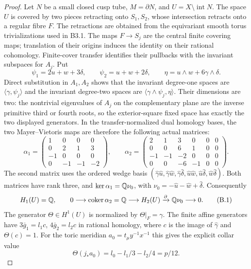 \begin{proof}
Let $N$ be a small closed cusp tube, $M=\partial N$, and
$U=X\setminus\operatorname{int}N$. The space $U$ is covered by
two pieces retracting onto $S_1,S_2$, whose intersection retracts
onto a regular fibre $F$. The retractions are obtained from the
equivariant smooth torus trivializations used in B3.1. The maps
$F\to S_j$ are the central finite covering maps; translation of
their origins induces the identity on their rational cohomology.
Finite-cover transfer identifies their pullbacks with the invariant
subspaces for $A_j$. Put
\[
 \psi_1=2u+w+3\delta,\qquad \psi_2=u+w+2\delta,
 \qquad \eta=u\wedge w+6\gamma\wedge\delta.
\]
Direct substitution in $A_1,A_2$ shows that the invariant
degree-one spaces are $\langle\gamma,\psi_j\rangle$ and the
invariant degree-two spaces are
$\langle\gamma\wedge\psi_j,\eta\rangle$.
Their dimensions are two: the nontrivial eigenvalues of $A_j$ on
the complementary plane are the inverse primitive third or fourth
roots, so the exterior-square fixed space has exactly the two
displayed generators.
In the transfer-normalized dual homology bases, the two
Mayer--Vietoris maps are therefore the following actual matrices:
\[
 \alpha_1=\begin{pmatrix}
 1&0&0&0\\0&2&1&3\\-1&0&0&0\\0&-1&-1&-2
 \end{pmatrix},\qquad
 \alpha_2=\begin{pmatrix}
 2&1&3&0&0&0\\0&0&6&1&0&0\\
 -1&-1&-2&0&0&0\\0&0&-6&-1&0&0
 \end{pmatrix}.
\]
The second matrix uses the ordered wedge basis
$(\hat\gamma\hat u,\hat\gamma\hat w,\hat\gamma\hat\delta,
\hat u\hat w,\hat u\hat\delta,\hat w\hat\delta)$.
Both matrices have rank three, and
$\ker\alpha_1=\mathbb Q\nu_0$, with
$\nu_0=-\hat u-\hat w+\hat\delta$.
Consequently
\[
 H_1(U)=\mathbb Q,\qquad
 0\longrightarrow\operatorname{coker}\alpha_2=\mathbb Q
 \longrightarrow H_2(U)
 \xrightarrow{\partial}\mathbb Q\nu_0\longrightarrow0.       \tag{B.1}
\]
The generator $\Theta\in H^1(U)$ is normalized by
$\Theta|_F=\gamma$. The finite affine generators have
$3\bar g_1=l_1c$, $4\bar g_2=l_2c$ in rational homology, where
$c$ is the image of $\hat\gamma$ and $\Theta(c)=1$.
For the toric meridian $a_0=t_\mu y^{-1}x^{-1}$ this gives the
explicit collar value
\[
 \Theta(j_*a_0)=l_0-l_1/3-l_2/4=p/12.                 \tag{B.2}
\]


\end{proof}
